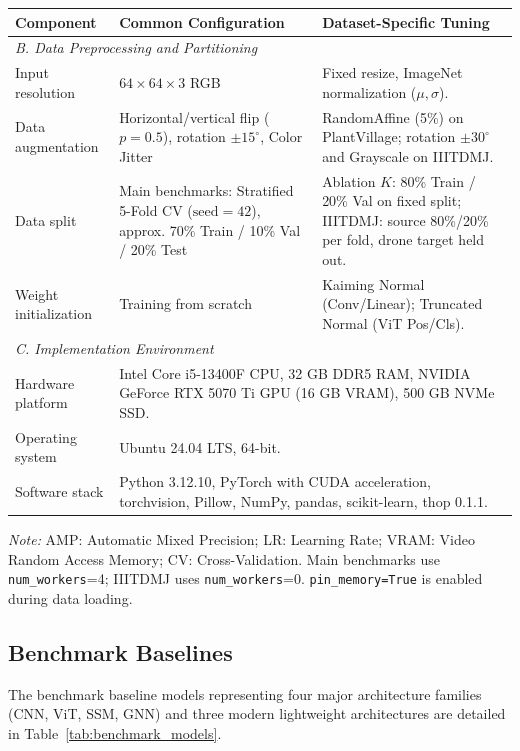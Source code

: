 \documentclass[]{interact}
\theoremstyle{plain}
\theoremstyle{definition}
\theoremstyle{remark}
\begin{document}
\begin{table}[H]
\addtocounter{table}{-1}
\footnotesize
\setlength{\tabcolsep}{3.5pt}
\renewcommand{\arraystretch}{1.10}
{\begin{tabular}{@{}p{3.1cm}p{5.4cm}p{5.7cm}@{}} \toprule
\textbf{Component} & \textbf{Common Configuration} & \textbf{Dataset-Specific Tuning} \\ \midrule
\multicolumn{3}{l}{\textit{B. Data Preprocessing and Partitioning}} \\ \midrule
Input resolution & $64 \times 64 \times 3$ RGB & Fixed resize, ImageNet normalization ($\mu, \sigma$). \\
Data augmentation & Horizontal/vertical flip ($p=0.5$), rotation $\pm 15^\circ$, Color Jitter & RandomAffine (5\%) on PlantVillage; rotation $\pm 30^\circ$ and Grayscale on IIITDMJ. \\
Data split & Main benchmarks: Stratified 5-Fold CV ($\text{seed}=42$), approx. 70\% Train / 10\% Val / 20\% Test & Ablation $K$: 80\% Train / 20\% Val on fixed split; IIITDMJ: source 80\%/20\% per fold, drone target held out. \\
Weight initialization & Training from scratch & Kaiming Normal (Conv/Linear); Truncated Normal (ViT Pos/Cls). \\ \midrule
\multicolumn{3}{l}{\textit{C. Implementation Environment}} \\ \midrule
Hardware platform & \multicolumn{2}{p{11.1cm}}{Intel Core i5-13400F CPU, 32 GB DDR5 RAM, NVIDIA GeForce RTX 5070 Ti GPU (16 GB VRAM), 500 GB NVMe SSD.} \\
Operating system & \multicolumn{2}{p{11.1cm}}{Ubuntu 24.04 LTS, 64-bit.} \\
Software stack & \multicolumn{2}{p{11.1cm}}{Python 3.12.10, PyTorch with CUDA acceleration, torchvision, Pillow, NumPy, pandas, scikit-learn, thop 0.1.1.} \\ \bottomrule
\end{tabular}}
\label{tab:training_protocol}
\parbox{\textwidth}{\vspace{2pt}\footnotesize\textit{Note:} AMP: Automatic Mixed Precision; LR: Learning Rate; VRAM: Video Random Access Memory; CV: Cross-Validation. Main benchmarks use \texttt{num\_workers}=4; IIITDMJ uses \texttt{num\_workers}=0. \texttt{pin\_memory=True} is enabled during data loading.}
\end{table}

\subsection{Benchmark Baselines}
The benchmark baseline models representing four major architecture families (CNN, ViT, SSM, GNN) and three modern lightweight architectures are detailed in Table~\ref{tab:benchmark_models}.
\end{document}
